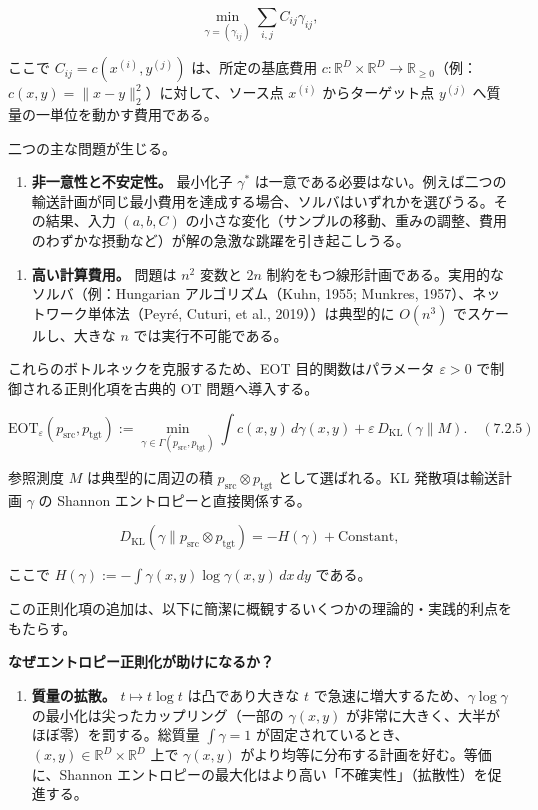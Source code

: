 \[
\min_{\gamma=(\gamma_{ij})}\sum_{i,j}C_{ij}\gamma_{ij},
\]


ここで $C_{ij}=c(x^{(i)},y^{(j)})$ は、所定の基底費用 $c:\mathbb{R}^D\times\mathbb{R}^D\to\mathbb{R}_{\ge 0}$（例：$c(x,y)=\|x-y\|_2^2$）に対して、ソース点 $x^{(i)}$ からターゲット点 $y^{(j)}$ へ質量の一単位を動かす費用である。

二つの主な問題が生じる。

\begin{enumerate}
\item \textbf{非一意性と不安定性。} 最小化子 $\gamma^*$ は一意である必要はない。例えば二つの輸送計画が同じ最小費用を達成する場合、ソルバはいずれかを選びうる。その結果、入力 $(a,b,C)$ の小さな変化（サンプルの移動、重みの調整、費用のわずかな摂動など）が解の急激な跳躍を引き起こしうる。
\end{enumerate}


\begin{enumerate}
\item \textbf{高い計算費用。} 問題は $n^2$ 変数と $2n$ 制約をもつ線形計画である。実用的なソルバ（例：Hungarian アルゴリズム（Kuhn, 1955; Munkres, 1957）、ネットワーク単体法（Peyré, Cuturi, et al., 2019））は典型的に $O(n^3)$ でスケールし、大きな $n$ では実行不可能である。
\end{enumerate}


これらのボトルネックを克服するため、EOT 目的関数はパラメータ $\varepsilon>0$ で制御される正則化項を古典的 OT 問題へ導入する。

\[
\mathrm{EOT}_\varepsilon(p_{\mathrm{src}},p_{\mathrm{tgt}})
:=
\min_{\gamma\in\Gamma(p_{\mathrm{src}},p_{\mathrm{tgt}})}
\int c(x,y)\,d\gamma(x,y)+\varepsilon\,D_{\mathrm{KL}}(\gamma\|M).
\quad (7.2.5)
\]


参照測度 $M$ は典型的に周辺の積 $p_{\mathrm{src}}\otimes p_{\mathrm{tgt}}$ として選ばれる。KL 発散項は輸送計画 $\gamma$ の Shannon エントロピーと直接関係する。

\[
D_{\mathrm{KL}}(\gamma\|p_{\mathrm{src}}\otimes p_{\mathrm{tgt}})=-H(\gamma)+\mathrm{Constant},
\]


ここで $H(\gamma):=-\int\gamma(x,y)\log\gamma(x,y)\,dx\,dy$ である。

この正則化項の追加は、以下に簡潔に概観するいくつかの理論的・実践的利点をもたらす。

\textbf{なぜエントロピー正則化が助けになるか？}

\begin{enumerate}
\item \textbf{質量の拡散。} $t\mapsto t\log t$ は凸であり大きな $t$ で急速に増大するため、$\gamma\log\gamma$ の最小化は尖ったカップリング（一部の $\gamma(x,y)$ が非常に大きく、大半がほぼ零）を罰する。総質量 $\int\gamma=1$ が固定されているとき、$(x,y)\in\mathbb{R}^D\times\mathbb{R}^D$ 上で $\gamma(x,y)$ がより均等に分布する計画を好む。等価に、Shannon エントロピーの最大化はより高い「不確実性」（拡散性）を促進する。
\end{enumerate}



